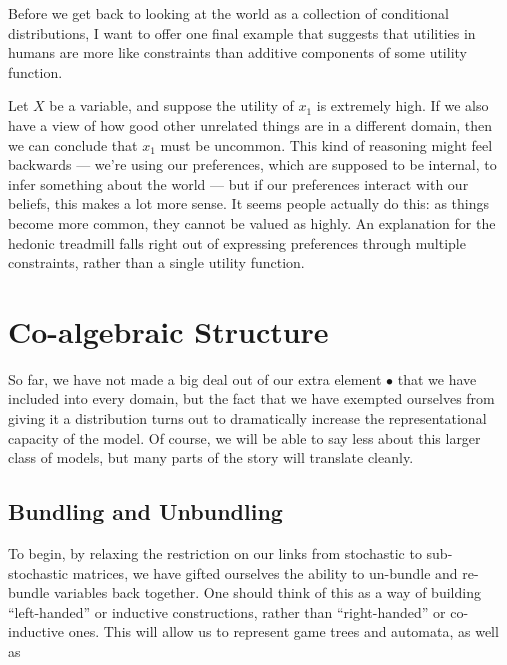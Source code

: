 \documentclass{article}
\begin{document}
	Before we get back to looking at the world as a collection of conditional distributions, I want to offer one final example that suggests that utilities in humans are more like constraints than additive components of some utility function. 
	
	Let $X$ be a variable, and suppose the utility of $x_1$ is extremely high. If we also have a view of how good other unrelated things are in a different domain, then we can conclude that $x_1$ must be uncommon. This kind of reasoning might feel backwards --- we're using our preferences, which are supposed to be internal, to infer something about the world --- but if our preferences interact with our beliefs, this makes a lot more sense. It seems people actually do this: as things become more common, they cannot be valued as highly. An explanation for the hedonic treadmill falls right out of expressing preferences through multiple constraints, rather than a single utility function.
	
	
	
	\section{Co-algebraic Structure}
	So far, we have not made a big deal out of our extra element $\bullet$ that we have included into every domain, but the fact that we have exempted ourselves from giving it a distribution turns out to dramatically increase the representational capacity of the model. Of course, we will be able to say less about this larger class of models, but many parts of the story will translate cleanly.
	
	\subsection{Bundling and Unbundling} 
	To begin, by relaxing the restriction on our links from stochastic to sub-stochastic matrices, we have gifted ourselves the ability to un-bundle and re-bundle variables back together. One should think of this as a way of building ``left-handed'' or inductive constructions, rather than ``right-handed'' or co-inductive ones. This will allow us to represent game trees and automata, as well as
	
	\begin{center}
		\begin{tikzpicture}
		
		\end{tikzpicture}
	\end{center}
	
\end{document}
